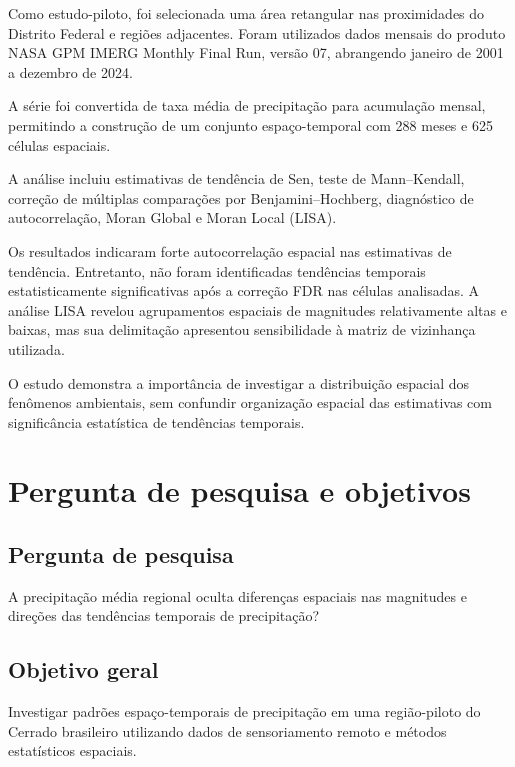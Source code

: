\documentclass[12pt,a4paper]{article}
\begin{document}
Como estudo-piloto, foi selecionada uma área retangular
nas proximidades do Distrito Federal e regiões adjacentes.
Foram utilizados dados mensais do produto NASA GPM IMERG
Monthly Final Run, versão 07, abrangendo janeiro de 2001
a dezembro de 2024.

A série foi convertida de taxa média de precipitação para
acumulação mensal, permitindo a construção de um conjunto
espaço-temporal com 288 meses e 625 células espaciais.

A análise incluiu estimativas de tendência de Sen,
teste de Mann--Kendall, correção de múltiplas comparações
por Benjamini--Hochberg, diagnóstico de autocorrelação,
Moran Global e Moran Local (LISA).

Os resultados indicaram forte autocorrelação espacial
nas estimativas de tendência. Entretanto, não foram
identificadas tendências temporais estatisticamente
significativas após a correção FDR nas células analisadas.
A análise LISA revelou agrupamentos espaciais de
magnitudes relativamente altas e baixas, mas sua
delimitação apresentou sensibilidade à matriz de
vizinhança utilizada.

O estudo demonstra a importância de investigar a
distribuição espacial dos fenômenos ambientais, sem
confundir organização espacial das estimativas com
significância estatística de tendências temporais.

\section{Pergunta de pesquisa e objetivos}

\subsection{Pergunta de pesquisa}

A precipitação média regional oculta diferenças
espaciais nas magnitudes e direções das tendências
temporais de precipitação?

\subsection{Objetivo geral}

Investigar padrões espaço-temporais de precipitação
em uma região-piloto do Cerrado brasileiro utilizando
dados de sensoriamento remoto e métodos estatísticos
espaciais.
\end{document}

